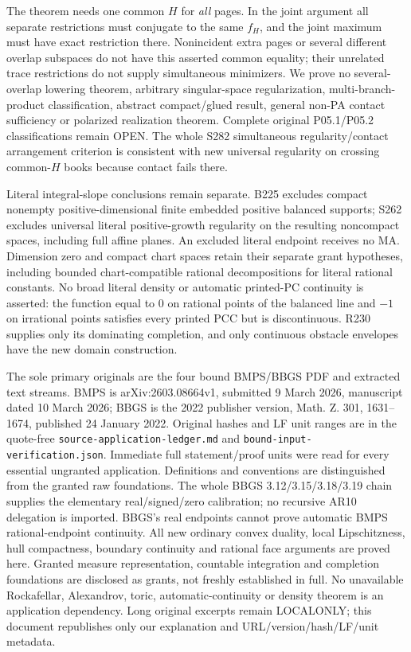 \documentclass[11pt]{article}
\begin{document}
The theorem needs one common $H$ for \emph{all} pages. In the joint argument all separate restrictions must conjugate to the same $f_H$, and the joint maximum must have exact restriction there. Nonincident extra pages or several different overlap subspaces do not have this asserted common equality; their unrelated trace restrictions do not supply simultaneous minimizers. We prove no several-overlap lowering theorem, arbitrary singular-space regularization, multi-branch-product classification, abstract compact/glued result, general non-PA contact sufficiency or polarized realization theorem. Complete original P05.1/P05.2 classifications remain OPEN. The whole S282 simultaneous regularity/contact arrangement criterion is consistent with new universal regularity on crossing common-$H$ books because contact fails there.

Literal integral-slope conclusions remain separate. B225 excludes compact nonempty positive-dimensional finite embedded positive balanced supports; S262 excludes universal literal positive-growth regularity on the resulting noncompact spaces, including full affine planes. An excluded literal endpoint receives no MA. Dimension zero and compact chart spaces retain their separate grant hypotheses, including bounded chart-compatible rational decompositions for literal rational constants. No broad literal density or automatic printed-PC continuity is asserted: the function equal to $0$ on rational points of the balanced line and $-1$ on irrational points satisfies every printed PCC but is discontinuous. R230 supplies only its dominating completion, and only continuous obstacle envelopes have the new domain construction.

The sole primary originals are the four bound BMPS/BBGS PDF and extracted text streams. BMPS is arXiv:2603.08664v1, submitted 9 March 2026, manuscript dated 10 March 2026; BBGS is the 2022 publisher version, Math. Z. 301, 1631--1674, published 24 January 2022. Original hashes and LF unit ranges are in the quote-free \texttt{source-application-ledger.md} and \texttt{bound-input-verification.json}. Immediate full statement/proof units were read for every essential ungranted application. Definitions and conventions are distinguished from the granted raw foundations. The whole BBGS 3.12/3.15/3.18/3.19 chain supplies the elementary real/signed/zero calibration; no recursive AR10 delegation is imported. BBGS's real endpoints cannot prove automatic BMPS rational-endpoint continuity. All new ordinary convex duality, local Lipschitzness, hull compactness, boundary continuity and rational face arguments are proved here. Granted measure representation, countable integration and completion foundations are disclosed as grants, not freshly established in full. No unavailable Rockafellar, Alexandrov, toric, automatic-continuity or density theorem is an application dependency. Long original excerpts remain LOCALONLY; this document republishes only our explanation and URL/version/hash/LF/unit metadata.
\end{document}
